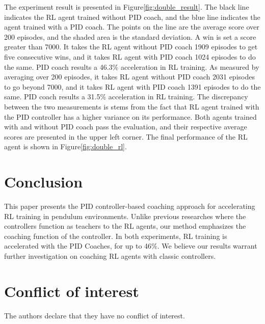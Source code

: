 The experiment result is presented in Figure\ref{fig:double_result}. The black line indicates the RL agent trained without PID coach, and the blue line indicates the agent trained with a PID coach. The points on the line are the average score over 200 episodes, and the shaded area is the standard deviation. A win is set a score greater than 7000. It takes the RL agent without PID coach 1909 episodes to get five consecutive wins, and it takes RL agent with PID coach 1024 episodes to do the same. PID coach results a 46.3\% acceleration in RL training. As measured by averaging over 200 episodes, it takes RL agent without PID coach 2031 episodes to go beyond 7000, and it takes RL agent with PID coach 1391 episodes to do the same. PID coach results a 31.5\% acceleration in RL training. The discrepancy between the two measurements is stems from the fact that RL agent trained with the PID controller has a higher variance on its performance. Both agents trained with and without PID coach pass the evaluation, and their respective average scores are presented in the upper left corner. The final performance of the RL agent is shown in Figure\ref{fig:double_rl}.


\section{Conclusion}

This paper presents the PID controller-based coaching approach for accelerating RL training in pendulum environments. Unlike previous researches where the controllers function as teachers to the RL agents, our method emphasizes the coaching function of the controller. In both experiments, RL training is accelerated with the PID Coaches, for up to 46\%. We believe our results warrant further investigation on coaching RL agents with classic controllers. 


\section{Conflict of interest}
%
The authors declare that they have no conflict of interest.





%
%




